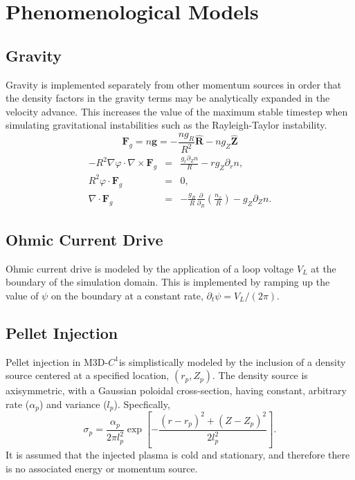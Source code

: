\documentclass[letterpaper]{book}
\renewcommand{\vec}[1]{\ensuremath{\mathbf{#1}}}
\newcommand{\tor}{\varphi}              %
\newcommand{\F}{\vec{F}}
\newcommand{\g}{\vec{g}}
\newcommand{\codename}{\textsc{M3D-$C^1$}}
\newcommand{\grad}[1]{\nabla #1}
\renewcommand{\div}[1]{\nabla \cdot #1}
\newcommand{\curl}[1]{\nabla \times #1}
\newcommand{\uvec}[1]{\ensuremath{\vec{\hat{#1}}}}
\begin{document}
\section{Phenomenological Models \label{sec:phenom_models}}

\subsection{Gravity}

Gravity is implemented separately from other momentum sources in order
that the density factors in the gravity terms may be analytically
expanded in the velocity advance.  This increases the value of the
maximum stable timestep when simulating gravitational instabilities
such as the Rayleigh-Taylor instability.
\begin{equation}
  \label{eq:gravity}
  \F_g = n \g = -\frac{n g_R}{R^2}\uvec{R} - n g_Z \uvec{Z}
\end{equation}
\begin{eqnarray*}
  -R^2 \grad \tor \cdot \curl \F_g & = & \frac{g_r \partial_Z n}{R} 
  - r g_Z \partial_r n,
  \\
  R^2 \tor \cdot \F_g & = & 0,
  \\
  \div{\F_g} & = & - \frac{g_R}{R} \frac{\partial}{\partial_R} \left(
  \frac{n_x}{R} \right) - g_Z \partial_Z n.
\end{eqnarray*}

\subsection{Ohmic Current Drive}

Ohmic current drive is modeled by the application of a
loop voltage $V_L$ at the boundary of the simulation domain.  This is
implemented by ramping up the value of $\psi$ on the boundary at a
constant rate, $\partial_t \psi = V_L/(2 \pi)$.

\subsection{Pellet Injection \label{sec:pellet_injection}}

Pellet injection in \codename is simplistically modeled by the
inclusion of a density source centered at a specified location, $(r_p,
Z_p)$.  The density source is axisymmetric, with a Gaussian poloidal
cross-section, having constant, arbitrary rate ($\alpha_p$) and
variance ($l_p$).  Specfically,
\begin{equation}
  \sigma_p = \frac{\alpha_{p}}{2 \pi l_{p}^2}
  \exp \left[ -\frac{(r-r_p)^2 + (Z-Z_p)^2}{2 l_p^2}\right].
\end{equation}
It is assumed that the injected plasma is cold and stationary, and
therefore there is no associated energy or momentum source.
\end{document}
